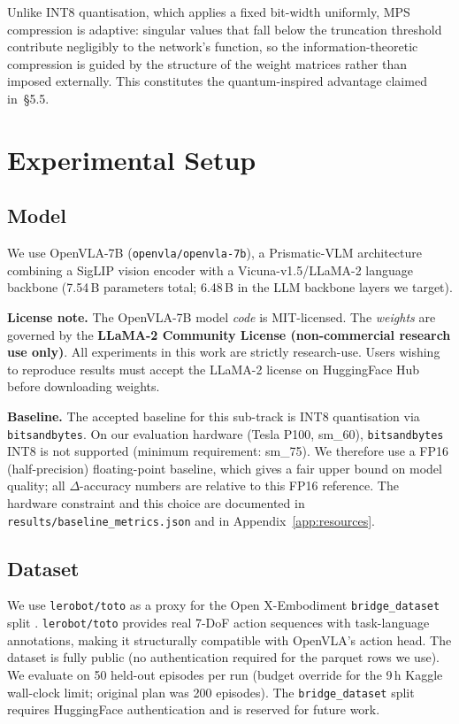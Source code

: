 \documentclass[10pt,twocolumn]{article}
\begin{document}
Unlike INT8 quantisation, which applies a fixed bit-width uniformly, MPS compression
is adaptive: singular values that fall below the truncation threshold contribute
negligibly to the network's function, so the information-theoretic compression is
guided by the structure of the weight matrices rather than imposed externally. This
constitutes the quantum-inspired advantage claimed in~\S5.5.

\section{Experimental Setup}

\subsection{Model}

We use OpenVLA-7B \cite{kim2024openvla} (\texttt{openvla/openvla-7b}), a
Prismatic-VLM architecture combining a SigLIP vision encoder with a
Vicuna-v1.5/LLaMA-2 language backbone (7.54\,B parameters total; 6.48\,B in the
LLM backbone layers we target).

\textbf{License note.} The OpenVLA-7B model \emph{code} is MIT-licensed.
The \emph{weights} are governed by the \textbf{LLaMA-2 Community License
(non-commercial research use only)}. All experiments in this work are strictly
research-use. Users wishing to reproduce results must accept the LLaMA-2 license
on HuggingFace Hub before downloading weights.

\textbf{Baseline.} The accepted baseline for this sub-track is INT8 quantisation
via \texttt{bitsandbytes}. On our evaluation hardware (Tesla P100, sm\_60),
\texttt{bitsandbytes} INT8 is not supported (minimum requirement: sm\_75). We
therefore use a FP16 (half-precision) floating-point baseline, which gives a fair
upper bound on model quality; all $\Delta$-accuracy numbers are relative to this
FP16 reference. The hardware constraint and this choice are documented in
\texttt{results/baseline\_metrics.json} and in Appendix~\ref{app:resources}.

\subsection{Dataset}

We use \texttt{lerobot/toto} as a proxy for the Open X-Embodiment
\texttt{bridge\_dataset} split \cite{open_x_embodiment_2023}. \texttt{lerobot/toto}
provides real 7-DoF action sequences with task-language annotations, making it
structurally compatible with OpenVLA's action head. The dataset is fully public
(no authentication required for the parquet rows we use). We evaluate on 50 held-out
episodes per run (budget override for the 9\,h Kaggle wall-clock limit; original
plan was 200 episodes). The \texttt{bridge\_dataset} split requires HuggingFace
authentication and is reserved for future work.
\end{document}
